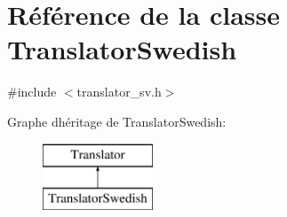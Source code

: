 \hypertarget{class_translator_swedish}{}\section{Référence de la classe Translator\+Swedish}
\label{class_translator_swedish}


{\ttfamily \#include $<$translator\+\_\+sv.\+h$>$}

Graphe d\textquotesingle{}héritage de Translator\+Swedish\+:\begin{figure}[H]
\begin{center}
\leavevmode
\includegraphics[height=2.000000cm]{class_translator_swedish}
\end{center}
\end{figure}

